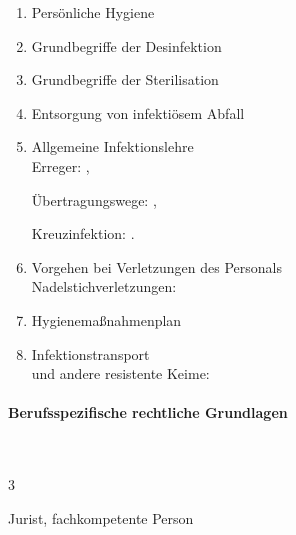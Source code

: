   \begin{enumerate}
    \item    Persönliche Hygiene
    \\
    \item    Grundbegriffe der Desinfektion \dotfill  {}
    \item    Grundbegriffe der  Sterilisation \dotfill  {}
    \item    Entsorgung von infektiösem Abfall \dotfill {}
    \item    Allgemeine Infektionslehre
    \\
    Erreger:  \dotfill {},
    
    Übertragungswege:  \dotfill {},
    
    Kreuzinfektion:  \dotfill {}.
    \item
    Vorgehen bei Verletzungen des Personals
    \\
    Nadelstichverletzungen:  \dotfill {}
    \item    Hygienemaßnahmenplan \dotfill  {}
    \item    Infektionstransport
    \\
     und andere resistente Keime:  \dotfill {}
  \end{enumerate}

\paragraph{Berufsspezifische rechtliche Grundlagen}  ~
  
  \begin{inparadesc}
    \item[Stundenanzahl:] 3
    \item[Lehrkraft:]  Jurist, fachkompetente Person
  \end{inparadesc}
  
